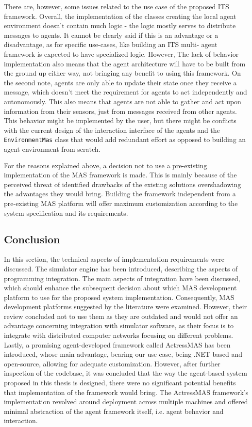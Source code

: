 \documentclass[main.tex]{subfiles}
\begin{document}
There are, however, some issues related to the use case of the proposed ITS framework. Overall, the implementation of the classes 
creating the local agent environment doesn't contain much logic - the logic mostly serves to distribute messages to agents. 
It cannot be clearly said if this is an advantage or a disadvantage, as for specific use-cases, like building an ITS multi-
agent framework is expected to have specialized logic. However, The lack of behavior implementation also means that the 
agent architecture will have to be built from the ground up either way, not bringing any benefit to using this framework. 
On the second note, agents are only able to update their state once they receive a message, which doesn't 
meet the requirement for agents to act independently and autonomously. This also means that agents are not able to gather 
and act upon information from their sensors, just from messages received from other agents. This behavior might be implemented 
by the user, but there might be conflicts with the current design of the interaction interface of the agents and the 
\texttt{EnvironmentMas} class that would add redundant effort as opposed to building an agent environment from scratch. 

For the reasons explained above, a decision not to use a pre-existing implementation of the MAS framework is made. This 
is mainly because of the perceived threat of identified drawbacks of the existing solutions overshadowing the advantages 
they would bring. Building the framework independent from a pre-existing MAS platform will offer maximum customization 
according to the system specification and its requirements. 

\subsection{Conclusion}

In this section, the technical aspects of implementation requirements were discussed. The
simulator engine has been introduced, describing the aspects of programming integration. The main
aspects of integration have been discussed, which should enhance the subsequent decision about
which MAS development platform to use for the proposed system implementation. Consequently, MAS
development platforms suggested by the literature were examined.  However, their review concluded
not to use them as they are outdated and would not offer an advantage concerning integration
with simulator software, as their focus is to integrate with distributed computer networks
focusing on different problems. Lastly, a promising agent-developed framework called 
ActressMAS has been introduced, whose main advantage, bearing our use-case, being .NET based
and open-source, allowing for adequate customization. However, after further inspection of the
codebase, it was concluded that the way the agent-based system proposed in this thesis is
designed, there were no significant potential benefits that implementation of the framework 
would bring. The ActressMAS framework's implementation revolved around deployment across 
multiple machines and offered minimal abstraction of the agent framework itself, i.e. 
agent behavior and interaction.

\clearpage
\end{document}
